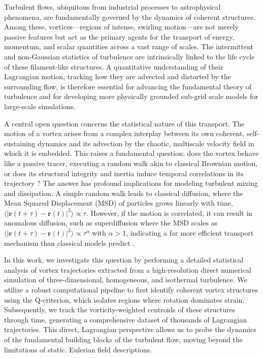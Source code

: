 \documentclass[]{article}
\begin{document}
Turbulent flows, ubiquitous from industrial processes to astrophysical phenomena, are fundamentally governed by the dynamics of coherent structures. Among these, vortices—regions of intense, swirling motion—are not merely passive features but act as the primary agents for the transport of energy, momentum, and scalar quantities across a vast range of scales. The intermittent and non-Gaussian statistics of turbulence are intrinsically linked to the life cycle of these filament-like structures. A quantitative understanding of their Lagrangian motion, tracking how they are advected and distorted by the surrounding flow, is therefore essential for advancing the fundamental theory of turbulence and for developing more physically grounded sub-grid scale models for large-scale simulations.

A central open question concerns the statistical nature of this transport. The motion of a vortex arises from a complex interplay between its own coherent, self-sustaining dynamics and its advection by the chaotic, multiscale velocity field in which it is embedded. This raises a fundamental question: does the vortex behave like a passive tracer, executing a random walk akin to classical Brownian motion, or does its structural integrity and inertia induce temporal correlations in its trajectory \citep{maiti2025vorticitypackingeffectslong}? The answer has profound implications for modeling turbulent mixing and dissipation. A simple random walk leads to classical diffusion, where the Mean Squared Displacement (MSD) of particles grows linearly with time, $\langle |\mathbf{r}(t+\tau) - \mathbf{r}(t)|^2 \rangle \propto \tau$. However, if the motion is correlated, it can result in anomalous diffusion, such as superdiffusion where the MSD scales as $\langle |\mathbf{r}(t+\tau) - \mathbf{r}(t)|^2 \rangle \propto \tau^\alpha$ with $\alpha > 1$, indicating a far more efficient transport mechanism than classical models predict \citep{leoncini2002jetsstickinessanomaloustransport,maiti2025vorticitypackingeffectslong}.

In this work, we investigate this question by performing a detailed statistical analysis of vortex trajectories extracted from a high-resolution direct numerical simulation of three-dimensional, homogeneous, and isothermal turbulence. We utilize a robust computational pipeline to first identify coherent vortex structures using the Q-criterion, which isolates regions where rotation dominates strain. Subsequently, we track the vorticity-weighted centroids of these structures through time, generating a comprehensive dataset of thousands of Lagrangian trajectories. This direct, Lagrangian perspective allows us to probe the dynamics of the fundamental building blocks of the turbulent flow, moving beyond the limitations of static, Eulerian field descriptions.
\end{document}
